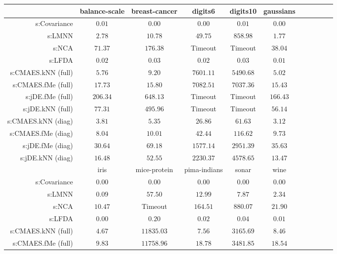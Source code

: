 \begin{table}[ht] \centering
{\small\renewcommand{\arraystretch}{1.0}
\setlength{\tabcolsep}{2pt}
\begin{tabular}{rcccccccccc}
\toprule


& \multicolumn{1}{c}{balance-scale} & \multicolumn{1}{c}{breast-cancer} & \multicolumn{1}{c}{digits6} & \multicolumn{1}{c}{digits10} & \multicolumn{1}{c}{gaussians} \\ 
\midrule
s:Covariance & $\bm{0.01}$ & $\bm{0.00}$ & $\bm{0.00}$ & $\bm{0.01}$ & $\bm{0.00}$ \\
s:LMNN & $2.78$ & $10.78$ & $49.75$ & $858.98$ & $1.77$ \\
s:NCA & $71.37$ & $176.38$ & Timeout  & Timeout  & $38.04$ \\
s:LFDA & $0.02$ & $0.03$ & $0.02$ & $0.03$ & $0.01$ \\
s:CMAES.kNN (full) & $5.76$ & $9.20$ & $7601.11$ & $5490.68$ & $5.02$ \\
s:CMAES.fMe (full) & $17.73$ & $15.80$ & $7082.51$ & $7037.36$ & $15.43$ \\
s:jDE.fMe (full) & $206.34$ & $648.13$ & Timeout  & Timeout  & $166.43$ \\
s:jDE.kNN (full) & $77.31$ & $495.96$ & Timeout  & Timeout  & $56.14$ \\
s:CMAES.kNN (diag) & $3.81$ & $5.35$ & $26.86$ & $61.63$ & $3.12$ \\
s:CMAES.fMe (diag) & $8.04$ & $10.01$ & $42.44$ & $116.62$ & $9.73$ \\
s:jDE.fMe (diag) & $30.64$ & $69.18$ & $1577.14$ & $2951.39$ & $35.63$ \\
s:jDE.kNN (diag) & $16.48$ & $52.55$ & $2230.37$ & $4578.65$ & $13.47$ \\
\midrule
& \multicolumn{1}{c}{iris} & \multicolumn{1}{c}{mice-protein} & \multicolumn{1}{c}{pima-indians} & \multicolumn{1}{c}{sonar} & \multicolumn{1}{c}{wine} \\ 
\midrule
s:Covariance & $\bm{0.00}$ & $\bm{0.00}$ & $\bm{0.00}$ & $\bm{0.00}$ & $\bm{0.00}$ \\
s:LMNN & $0.09$ & $57.50$ & $12.99$ & $7.87$ & $2.34$ \\
s:NCA & $10.47$ & Timeout  & $164.51$ & $880.07$ & $21.90$ \\
s:LFDA & $\bm{0.00}$ & $0.20$ & $0.02$ & $0.04$ & $0.01$ \\
s:CMAES.kNN (full) & $4.67$ & $11835.03$ & $7.56$ & $3165.69$ & $8.46$ \\
s:CMAES.fMe (full) & $9.83$ & $11758.96$ & $18.78$ & $3481.85$ & $18.54$ \\

\end{tabular}}
\end{table}
